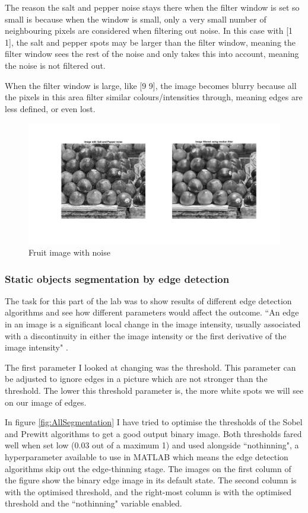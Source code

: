 \documentclass[11pt, letterpaper]{article}
\begin{document}
The reason the salt and pepper noise stays there when the filter window is set so small is because when the window is small, only a very small number of neighbouring pixels are considered when filtering out noise. In this case with [1 1], the salt and pepper spots may be larger than the filter window, meaning the filter window sees the rest of the noise and only takes this into account, meaning the noise is not filtered out.

When the filter window is large, like [9 9], the image becomes blurry because all the pixels in this area filter similar colours/intensities through, meaning edges are less defined, or even lost.

\begin{figure}[ht]
  \centering
  \includegraphics[width=1\linewidth]{Lab 1/NoiseSynthesisedRemovedWithMedian.png}
  \caption{Fruit image with noise}
  \label{fig:NoiseSynthesisedRemovedWithMedian}
\end{figure}

\subsubsection*{Static objects segmentation by edge detection}
The task for this part of the lab was to show results of different edge detection algorithms and see how different parameters would affect the outcome. ``An edge in an image is a significant local change in the image intensity, usually associated with a discontinuity in either the image intensity or the first derivative of the image intensity" \cite{Jain}. 

The first parameter I looked at changing was the threshold. This parameter can be adjusted to ignore edges in a picture which are not stronger than the threshold. The lower this threshold parameter is, the more white spots we will see on our image of edges. 

In figure \ref{fig:AllSegmentation} I have tried to optimise the thresholds of the Sobel and Prewitt algorithms to get a good output binary image. Both thresholds fared well when set low (0.03 out of a maximum 1) and used alongside ``nothinning", a hyperparameter available to use in MATLAB \cite{MATLABedge} which means the edge detection algorithms skip out the edge-thinning stage. The images on the first column of the figure show the binary edge image in its default state. The second column is with the optimised threshold, and the right-most column is with the optimised threshold and the ``nothinning" variable enabled.
\end{document}
